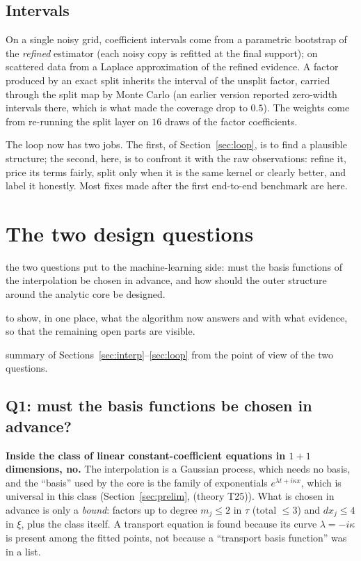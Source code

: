 \documentclass[11pt,a4paper]{article}
\theoremstyle{definition}
\newcommand{\sectionbrief}[3]{\begin{leadin}\begin{description}[nosep,leftmargin=3.0cm,labelwidth=2.8cm]
  \item[Starting from] #1
  \item[Why this section] #2
  \item[Role in the paper] #3
  \end{description}\end{leadin}}
\newcommand{\thy}[1]{\textcolor{cG}{\textsf{\footnotesize(theory #1)}}}
\begin{document}
\subsection{Intervals}
On a single noisy grid, coefficient intervals come from a parametric bootstrap of the \emph{refined} estimator (each noisy copy is refitted at the final support); on scattered data from a Laplace approximation of the refined evidence. A factor produced by an exact split inherits the interval of the unsplit factor, carried through the split map by Monte Carlo (an earlier version reported zero-width intervals there, which is what made the coverage drop to $0.5$). The weights come from re-running the split layer on $16$ draws of the factor coefficients.

\begin{takeaway}
The loop now has two jobs. The first, of Section~\ref{sec:loop}, is to find a plausible structure; the second, here, is to confront it with the raw observations: refine it, price its terms fairly, split only when it is the same kernel or clearly better, and label it honestly. Most fixes made after the first end-to-end benchmark are here.
\end{takeaway}



\section{The two design questions}\label{sec:q}
\sectionbrief
{the two questions put to the machine-learning side: must the basis functions of the interpolation be chosen in advance, and how should the outer structure around the analytic core be designed.}
{to show, in one place, what the algorithm now answers and with what evidence, so that the remaining open parts are visible.}
{summary of Sections~\ref{sec:interp}--\ref{sec:loop} from the point of view of the two questions.}

\subsection{Q1: must the basis functions be chosen in advance?}
\textbf{Inside the class of linear constant-coefficient equations in $1+1$ dimensions, no.} The interpolation is a Gaussian process, which needs no basis, and the ``basis'' used by the core is the family of exponentials $e^{\lambda t+i\kappa x}$, which is universal in this class (Section~\ref{sec:prelim}, \thy{T25}). What is chosen in advance is only a \emph{bound}: factors up to degree $m_j\le2$ in $\tau$ (total $\le3$) and $dx_j\le4$ in $\xi$, plus the class itself. A transport equation is found because its curve $\lambda=-i\kappa$ is present among the fitted points, not because a ``transport basis function'' was in a list.
\end{document}
